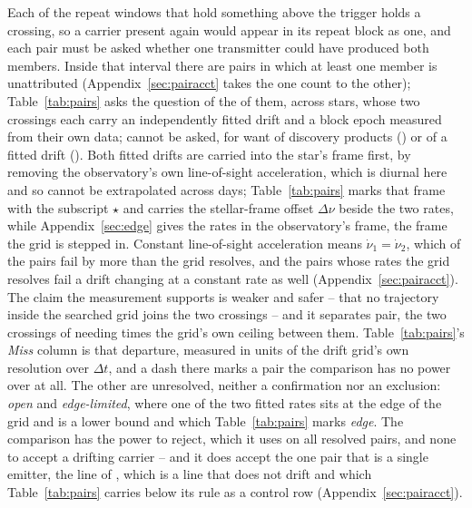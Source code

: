 Each of the \WdNExc{} repeat windows that hold something above the trigger
holds a crossing, so a carrier present again would appear in its repeat block
as one, and each pair must be asked whether one transmitter could have
produced both members. Inside that interval there are \TjNCandPair{} pairs in
which at least one member is unattributed
(Appendix~\ref{sec:pairacct} takes the one count to the other);
Table~\ref{tab:pairs} asks the question of the \TjNPair{} of them, across
\TjNStarPair{} stars, whose two crossings each carry an independently fitted
drift and a block epoch measured from their own data; \TjNCandLost{} cannot
be asked, for want of discovery products (\TjNCandLostSpec) or of a fitted
drift (\TjNCandLostFit). Both fitted drifts are
carried into the star's frame first, by removing the observatory's own
line-of-sight acceleration, which is diurnal here and so cannot be
extrapolated across days; Table~\ref{tab:pairs} marks that frame with the
subscript $\star$ and carries the stellar-frame offset $\Delta\nu$ beside the
two rates, while Appendix~\ref{sec:edge} gives the rates in the observatory's
frame, the frame the grid is stepped in. Constant line-of-sight acceleration means
$\dot\nu_1=\dot\nu_2$, which \TjNUneqDrift{} of the \TjNPair{} pairs fail by
more than the grid resolves, and the \TjNPower{} pairs whose rates the grid
resolves fail a drift changing at a constant rate as well
(Appendix~\ref{sec:pairacct}). The claim the measurement supports is
weaker and safer -- that no trajectory inside the searched grid joins the two
crossings -- and it separates \TjNExcl{} pair, the two crossings of
\EcGridStar{} needing \EcGridFactor{} times the grid's own ceiling between
them. Table~\ref{tab:pairs}'s \emph{Miss} column is that departure, measured
in units of the drift grid's own resolution over $\Delta t$, and a dash there
marks a pair the comparison has no power over at all.
The other \TjNOpen{} are unresolved, neither a confirmation nor an exclusion:
\TjNOpenPlain{} \emph{open} and \TjNPairEdge{} \emph{edge-limited}, where one
of the two fitted rates sits at the edge of the grid and is a lower bound and
which Table~\ref{tab:pairs} marks \emph{edge}. The comparison has the power to reject,
which it uses on all \TjNPower{} resolved pairs, and none to accept a drifting
carrier -- and it does accept the one pair that is a single emitter, the
\TjCtlLine{} line of \TjCtlStar, which is a line that does not drift and
which Table~\ref{tab:pairs} carries below its rule as a control row
(Appendix~\ref{sec:pairacct}).

